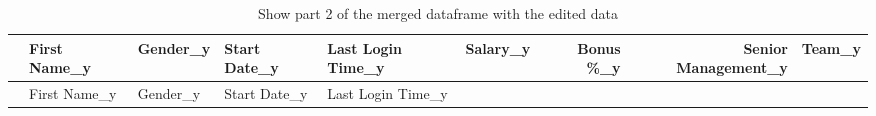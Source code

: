 \documentclass [oneside,10pt,a4paper,ngerman,BCOR10mm,headsepline,parindent,final]{scrartcl}
\begin{document}
    
    \begin{longtable}[]{@{}rllllrrrl@{}}
\caption{Show part 2 of the merged dataframe with the edited
data}\tabularnewline
\toprule
\begin{minipage}[b]{0.03\columnwidth}\raggedleft
\strut
\end{minipage} & \begin{minipage}[b]{0.09\columnwidth}\raggedright
First Name\_y\strut
\end{minipage} & \begin{minipage}[b]{0.06\columnwidth}\raggedright
Gender\_y\strut
\end{minipage} & \begin{minipage}[b]{0.09\columnwidth}\raggedright
Start Date\_y\strut
\end{minipage} & \begin{minipage}[b]{0.11\columnwidth}\raggedright
Last Login Time\_y\strut
\end{minipage} & \begin{minipage}[b]{0.06\columnwidth}\raggedleft
Salary\_y\strut
\end{minipage} & \begin{minipage}[b]{0.07\columnwidth}\raggedleft
Bonus \%\_y\strut
\end{minipage} & \begin{minipage}[b]{0.12\columnwidth}\raggedleft
Senior Management\_y\strut
\end{minipage} & \begin{minipage}[b]{0.12\columnwidth}\raggedright
Team\_y\strut
\end{minipage}\tabularnewline
\midrule
\endfirsthead
\toprule
\begin{minipage}[b]{0.03\columnwidth}\raggedleft
\strut
\end{minipage} & \begin{minipage}[b]{0.09\columnwidth}\raggedright
First Name\_y\strut
\end{minipage} & \begin{minipage}[b]{0.06\columnwidth}\raggedright
Gender\_y\strut
\end{minipage} & \begin{minipage}[b]{0.09\columnwidth}\raggedright
Start Date\_y\strut
\end{minipage} & \begin{minipage}[b]{0.11\columnwidth}\raggedright
Last Login Time\_y\strut
\end{minipage} & \begin{minipage}[b]{0.06\columnwidth}\raggedleft

\end{minipage}
\end{longtable}
\end{document}
